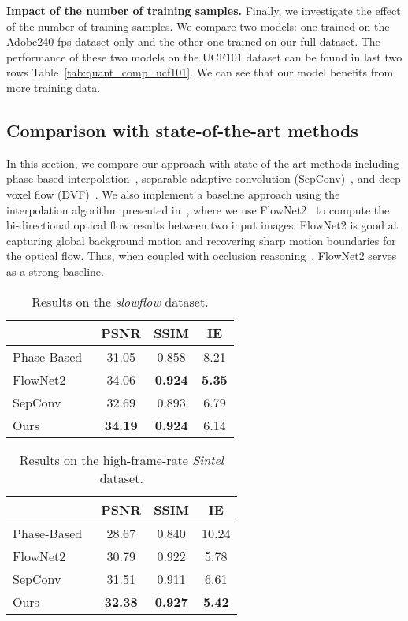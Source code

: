 \documentclass[10pt,twocolumn,letterpaper]{article}
\makeatletter
\def\fps{-fps\@\xspace}
\makeatother
\begin{document}
\noindent\textbf{Impact of the number of training samples.} Finally, we investigate the effect of the number of training samples. We compare two models: one trained on the Adobe240\fps dataset only and the other one trained on our full dataset. The performance of these two models on the UCF101 dataset can be found in last two rows Table~\ref{tab:quant_comp_ucf101}. We can see that our model benefits from more training data.

\subsection{Comparison with state-of-the-art methods} 
In this section, we compare our approach with state-of-the-art methods including phase-based interpolation~\cite{meyer15phase}, separable adaptive convolution (SepConv)~\cite{niklaus17video_iccv}, and deep voxel flow (DVF)~\cite{liu17video}. We also implement a baseline approach using the interpolation algorithm presented in~\cite{baker11a}, where we use FlowNet2~\cite{ilg16flownet2} to compute the bi-directional optical flow results between two input images. FlowNet2 is good at capturing global background motion and recovering sharp motion boundaries for the optical flow. Thus, when coupled with occlusion reasoning~\cite{baker11a}, FlowNet2 serves as a strong baseline.

\begin{table}
\caption{Results on the \emph{slowflow} dataset.}
\label{tab:quant_comp_slowflow}
\centering
\begin{tabular}{lccc}
\toprule
 & PSNR & SSIM & IE \\
\midrule
Phase-Based~\cite{meyer15phase} & 31.05 & 0.858 & 8.21 \\
FlowNet2~\cite{baker11a,ilg16flownet2} & 34.06 & \textbf{0.924} & \textbf{5.35} \\
SepConv~\cite{niklaus17video_iccv} & 32.69 & 0.893 & 6.79 \\
\midrule
Ours & \textbf{34.19} & \textbf{0.924} & 6.14 \\
\bottomrule
\end{tabular}
\end{table}

\begin{table}
\setlength{\belowcaptionskip}{-5pt}
\caption{Results on the high-frame-rate \emph{Sintel} dataset.}
\label{tab:quant_comp_hfr_sintel}
\centering
\begin{tabular}{lccc}
\toprule
 & PSNR & SSIM & IE \\
\midrule
Phase-Based~\cite{meyer15phase} & 28.67 & 0.840 & 10.24 \\
FlowNet2~\cite{baker11a,ilg16flownet2} & 30.79 & 0.922 & 5.78 \\
SepConv~\cite{niklaus17video_iccv} & 31.51 & 0.911 & 6.61 \\
\midrule
Ours & \textbf{32.38} & \textbf{0.927} & \textbf{5.42} \\
\bottomrule
\end{tabular}
\end{table}
\end{document}

